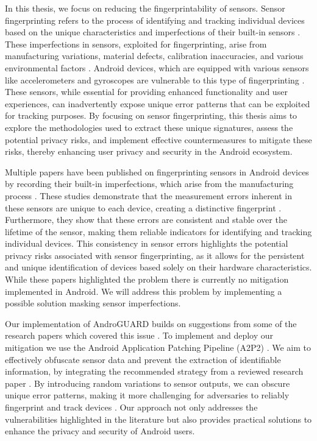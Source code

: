 \documentclass[11pt,
  oneside,openany,    %
]{scrreprt}
\begin{document}
In this thesis, we focus on reducing the fingerprintability of sensors.
Sensor fingerprinting refers to the process of identifying and tracking individual devices based on the unique characteristics and imperfections of their built-in sensors \cite{DBLP:conf/ndss/DeyRXCN14}. 
These imperfections in sensors, exploited for fingerprinting, arise from manufacturing variations, material defects, calibration inaccuracies, and various environmental factors \cite{DBLP:journals/comsur/BaldiniS17, DBLP:journals/popets/DasBC18, DBLP:journals/tifs/ZhangBS21}. 
Android devices, which are equipped with various sensors like accelerometers and gyroscopes are vulnerable to this type of fingerprinting \cite{DBLP:conf/ndss/DasBC16}. 
These sensors, while essential for providing enhanced functionality and user experiences, can inadvertently expose unique error patterns that can be exploited for tracking purposes. 
By focusing on sensor fingerprinting, this thesis aims to explore the methodologies used to extract these unique signatures, assess the potential privacy risks, and implement effective countermeasures to mitigate these risks, thereby enhancing user privacy and security in the Android ecosystem.

Multiple papers have been published on fingerprinting sensors in Android devices by recording their built-in imperfections, which arise from the manufacturing process \cite{DBLP:conf/ccs/DasBC14}. 
These studies demonstrate that the measurement errors inherent in these sensors are unique to each device, creating a distinctive fingerprint \cite{DBLP:conf/ccs/0001ABP18, DBLP:journals/tifs/AmeriniBCMN17}. 
Furthermore, they show that these errors are consistent and stable over the lifetime of the sensor, making them reliable indicators for identifying and tracking individual devices. 
This consistency in sensor errors highlights the potential privacy risks associated with sensor fingerprinting, as it allows for the persistent and unique identification of devices based solely on their hardware characteristics.
While these papers highlighted the problem there is currently no mitigation implemented in Android.
We will address this problem by implementing a possible solution masking sensor imperfections.

Our implementation of AndroGUARD builds on suggestions from some of the research papers which covered this issue \cite{DBLP:conf/ndss/DasBC16, DBLP:journals/tifs/AmeriniBCMN17, DBLP:conf/ccs/0001ABP18}. 
To implement and deploy our mitigation we use the Android Application Patching Pipeline (A2P2) \cite{DBLP:conf/IEEEares/Draschbacher23}.
We aim to effectively obfuscate sensor data and prevent the extraction of identifiable information, by integrating the recommended strategy from a reviewed research paper \cite{DBLP:conf/ndss/DasBC16}. 
By introducing random variations to sensor outputs, we can obscure unique error patterns, making it more challenging for adversaries to reliably fingerprint and track devices \cite{DBLP:journals/tifs/AmeriniBCMN17}. 
Our approach not only addresses the vulnerabilities highlighted in the literature but also provides practical solutions to enhance the privacy and security of Android users.
\end{document}
